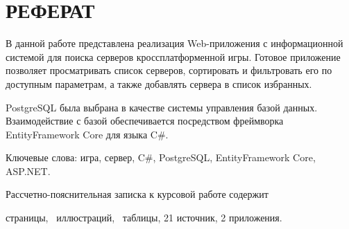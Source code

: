 \chapter*{РЕФЕРАТ}

В данной работе представлена реализация Web-приложения с информационной системой для поиска серверов кроссплатформенной игры. Готовое приложение позволяет просматривать список серверов, сортировать и фильтровать его по доступным параметрам, а также добавлять сервера в список избранных.

PostgreSQL была выбрана в качестве системы управления базой данных. Взаимодействие с базой обеспечивается посредством фреймворка EntityFramework Core для языка C\#.

Ключевые слова: игра, сервер, C\#, PostgreSQL, EntityFramework Core, ASP.NET.

Рассчетно-пояснительная записка к курсовой работе содержит \begin{NoHyper}\pageref{LastPage}\end{NoHyper} страницы, \totfig~иллюстраций, \tottab~таблицы, 21 источник, 2 приложения. %
